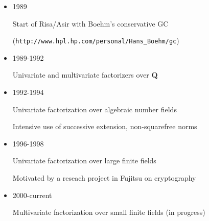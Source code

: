 \documentclass{slides}
\begin{document}
%
%
%
%
%
%
%
%
%
%

\begin{slide}{}

\begin{itemize}
\item 1989

Start of Risa/Asir with Boehm's conservative GC 

({\tt http://www.hpl.hp.com/personal/Hans\_Boehm/gc})

\item 1989-1992

Univariate and multivariate factorizers over {\bf Q}

\item 1992-1994

Univariate factorization over algebraic number fields

Intensive use of successive extension, non-squarefree norms

\item 1996-1998

Univariate factorization over large finite fields

Motivated by a reseach project in Fujitsu on cryptography

\item 2000-current 

Multivariate factorization over small finite fields (in progress)
\end{itemize}
\end{slide}
\end{document}
